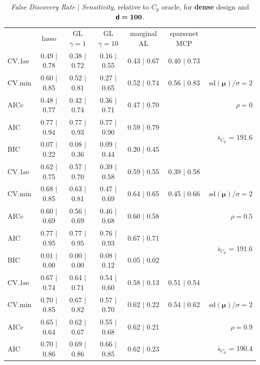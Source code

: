 \documentclass[12pt]{article}
\newcommand{\mr}[1]{\mathrm{#1}}
\newcommand{\bm}[1]{\mathbf{#1}}
\begin{document}
\begin{table}[p]\vspace{-.5cm}
\caption[l]{ {\it False Discovery Rate $\mid$ Sensitivity}, 
relative to $C_p$ oracle, for {\bf dense} design and $\boldsymbol{{\sf d}=100}$.}
\vspace{-.5cm}
\small{}
\begin{center}
\begin{tabular}{l*{5}{c}|r}
 & lasso & GL $\gamma=1$ & GL $\gamma=10$ & marginal AL & sparsenet MCP  & \\
 \cline{1-7}
CV.1se & 0.49 $\mid$ 0.78 & 0.38 $\mid$ 0.72 & 0.16 $\mid$ 0.55 & 0.43 $\mid$ 0.67 & 0.40 $\mid$ 0.73 &\\
CV.min & 0.60 $\mid$ 0.85 & 0.52 $\mid$ 0.81 & 0.27 $\mid$ 0.65 & 0.52 $\mid$ 0.74 & 0.56 $\mid$ 0.83 &  $\mr{sd}(\bm{\mu})/\sigma=2$ \\
AICc & 0.48 $\mid$ 0.77 & 0.42 $\mid$ 0.74 & 0.36 $\mid$ 0.71 & 0.47 $\mid$ 0.70 & & $\rho=0$ \\
AIC & 0.77 $\mid$ 0.94 & 0.77 $\mid$ 0.93 & 0.77 $\mid$ 0.90 & 0.59 $\mid$ 0.79 & & \multirow{2}{*}{$\bar{s}_{C_p}$ = 191.6} \\
BIC & 0.07 $\mid$ 0.22 & 0.08 $\mid$ 0.36 & 0.09 $\mid$ 0.44 & 0.20 $\mid$ 0.45 & & \\
 \hline 
CV.1se & 0.62 $\mid$ 0.75 & 0.57 $\mid$ 0.70 & 0.39 $\mid$ 0.58 & 0.59 $\mid$ 0.55 & 0.39 $\mid$ 0.58 &\\
CV.min & 0.68 $\mid$ 0.85 & 0.63 $\mid$ 0.81 & 0.47 $\mid$ 0.69 & 0.64 $\mid$ 0.65 & 0.45 $\mid$ 0.66 &  $\mr{sd}(\bm{\mu})/\sigma=2$ \\
AICc & 0.60 $\mid$ 0.69 & 0.56 $\mid$ 0.69 & 0.46 $\mid$ 0.68 & 0.60 $\mid$ 0.58 & & $\rho=0.5$ \\
AIC & 0.77 $\mid$ 0.95 & 0.77 $\mid$ 0.95 & 0.76 $\mid$ 0.93 & 0.67 $\mid$ 0.71 & & \multirow{2}{*}{$\bar{s}_{C_p}$ = 191.6} \\
BIC & 0.01 $\mid$ 0.00 & 0.00 $\mid$ 0.00 & 0.08 $\mid$ 0.12 & 0.05 $\mid$ 0.02 & & \\
 \hline 
CV.1se & 0.67 $\mid$ 0.74 & 0.64 $\mid$ 0.71 & 0.54 $\mid$ 0.60 & 0.58 $\mid$ 0.13 & 0.51 $\mid$ 0.54 &\\
CV.min & 0.70 $\mid$ 0.85 & 0.67 $\mid$ 0.82 & 0.57 $\mid$ 0.70 & 0.62 $\mid$ 0.22 & 0.54 $\mid$ 0.62 &  $\mr{sd}(\bm{\mu})/\sigma=2$ \\
AICc & 0.65 $\mid$ 0.64 & 0.62 $\mid$ 0.67 & 0.55 $\mid$ 0.68 & 0.62 $\mid$ 0.21 & & $\rho=0.9$ \\
AIC & 0.70 $\mid$ 0.86 & 0.69 $\mid$ 0.86 & 0.66 $\mid$ 0.85 & 0.62 $\mid$ 0.23 & & \multirow{2}{*}{$\bar{s}_{C_p}$ = 190.4} \\

\end{tabular}
\end{center}
\end{table}
\end{document}
